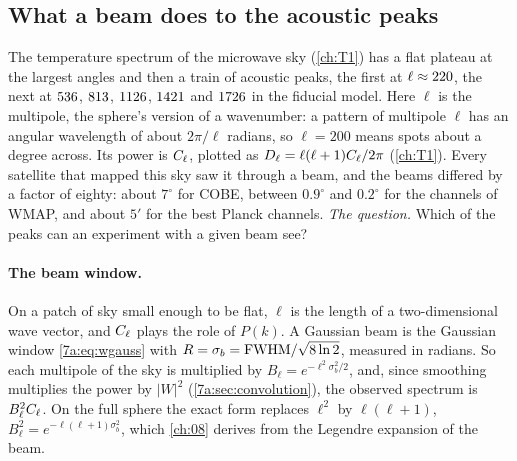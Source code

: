 \subsection{What a beam does to the acoustic peaks}
\label{7a:sec:beam-peaks}

The temperature spectrum of the microwave sky (\cref{ch:T1}) has a flat plateau at the largest
angles and then a train of acoustic peaks, the first at $\ell\approx220$, the next at
$536$, $813$, $1126$, $1421$ and $1726$ in the fiducial model. Here
$\ell$ is the multipole, the sphere's version of a wavenumber: a pattern of multipole $\ell$ has an
angular wavelength of about $2\pi/\ell$ radians, so $\ell=200$ means spots about a degree across.
Its power is $C_\ell$, plotted as $D_\ell=\ell(\ell+1)C_\ell/2\pi$ (\cref{ch:T1}). Every satellite that
mapped this sky saw it through a beam, and the beams differed by a factor of eighty: about $7^\circ$
for COBE, between $0.9^\circ$ and $0.2^\circ$ for the channels of WMAP, and about $5'$ for the best
Planck channels. \emph{The question.} Which of the peaks can an experiment with a given beam see?

\paragraph{The beam window.}
On a patch of sky small enough to be flat, $\ell$ is the length of a two-dimensional wave vector,
and $C_\ell$ plays the role of $P(k)$. A Gaussian beam is the Gaussian window
\eqref{7a:eq:wgauss} with $R=\sigma_b={\rm FWHM}/\sqrt{8\ln2}$, measured in radians. So each
multipole of the sky is multiplied by $B_\ell=e^{-\ell^2\sigma_b^2/2}$, and, since smoothing
multiplies the power by $|W|^2$ (\cref{7a:sec:convolution}), the observed spectrum is
$B_\ell^2C_\ell$. On the full sphere the exact form replaces $\ell^2$ by $\ell(\ell+1)$,
$B_\ell^2=e^{-\ell(\ell+1)\sigma_b^2}$, which \cref{ch:08} derives from the Legendre expansion of
the beam.

